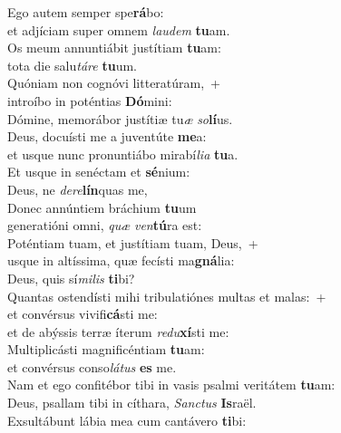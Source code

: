 \evenverse Ego autem semper spe\textbf{rá}bo:~\*\\
\evenverse et adjíciam super omnem \textit{lau}\textit{dem} \textbf{tu}am.\\
\oddverse Os meum annuntiábit justítiam \textbf{tu}am:~\*\\
\oddverse tota die salu\textit{tá}\textit{re} \textbf{tu}um.\\
\evenverse Quóniam non cognóvi litteratúram,~+\\
\evenverse  introíbo in poténtias \textbf{Dó}mini:~\*\\
\evenverse Dómine, memorábor justítiæ tu\textit{æ} \textit{so}\textbf{lí}us.\\
\oddverse Deus, docuísti me a juventúte \textbf{me}a:~\*\\
\oddverse et usque nunc pronuntiábo mirabí\textit{li}\textit{a} \textbf{tu}a.\\
\evenverse Et usque in senéctam et \textbf{sé}nium:~\*\\
\evenverse Deus, ne \textit{de}\textit{re}\textbf{lín}quas me,\\
\oddverse Donec annúntiem bráchium \textbf{tu}um~\*\\
\oddverse generatióni omni, \textit{quæ} \textit{ven}\textbf{tú}ra est:\\
\evenverse Poténtiam tuam, et justítiam tuam, Deus,~+\\
\evenverse  usque in altíssima, quæ fecísti ma\textbf{gná}lia:~\*\\
\evenverse Deus, quis sí\textit{mi}\textit{lis} \textbf{ti}bi?\\
\oddverse Quantas ostendísti mihi tribulatiónes multas et malas:~+\\
\oddverse  et convérsus vivifi\textbf{cá}sti me:~\*\\
\oddverse et de abýssis terræ íterum \textit{re}\textit{du}\textbf{xí}sti me:\\
\evenverse Multiplicásti magnificéntiam \textbf{tu}am:~\*\\
\evenverse et convérsus conso\textit{lá}\textit{tus} \textbf{es} me.\\
\oddverse Nam et ego confitébor tibi in vasis psalmi veritátem \textbf{tu}am:~\*\\
\oddverse Deus, psallam tibi in cíthara, \textit{San}\textit{ctus} \textbf{Is}raël.\\
\evenverse Exsultábunt lábia mea cum cantávero \textbf{ti}bi:~\*\\
